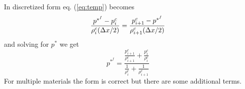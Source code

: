 \documentclass[fleqn]{article}
\begin{document}
{In discretized form eq. (\ref{eq:temp}) becomes
\begin{equation}
    \frac{p^{*^{f}} 
    - p^{c}_{i}}{\rho^{c}_{i}(\delx/2)} 
    = 
    \frac{p^{c}_{i+1} 
    - p^{*^{f}}}{\rho^{c}_{i+1}(\delx/2)}
\end{equation}
%
and solving for $p^{*}$ we get
%
\begin{equation}
    \label{eq:pstar}
    p^{*^{f}} 
    = \frac{ \frac{p^{c}_{i+1}}{\rho^{c}_{i+1}} 
    + \frac{p^{c}_{i}}{\rho^{c}_{i}} }{\frac{1}{\rho^{c}_{i}} 
    + \frac{1}{\rho^{c}_{i+1}}}
\end{equation}
For multiple materials the form is correct but there are some additional terms.
%
%
%
%
}
\end{document}
